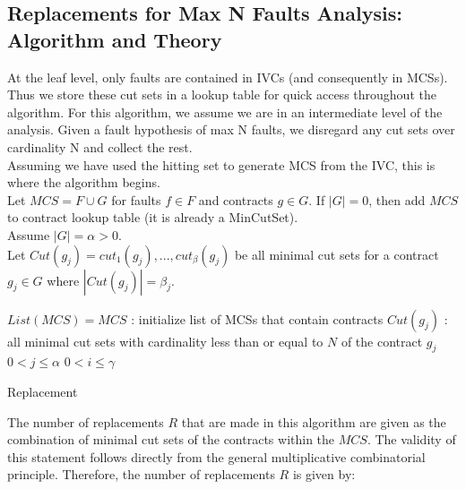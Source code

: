 \subsection{Replacements for Max N Faults Analysis: Algorithm and Theory}

At the leaf level, only faults are contained in IVCs (and consequently in MCSs). Thus we store these cut sets in a lookup table for quick access throughout the algorithm. For this algorithm, we assume we are in an intermediate level of the analysis. Given a fault hypothesis of max N faults, we disregard any cut sets over cardinality N and collect the rest.\\

Assuming we have used the hitting set to generate MCS from the IVC, this is where the algorithm begins. \\

Let $MCS = F \cup G$ for faults $f \in F$ and contracts $g \in G$. If $|G| = 0$, then add $MCS$ to contract lookup table (it is already a MinCutSet). \\

Assume $|G| = \alpha > 0$.\\

Let $Cut(g_j) = {cut_1(g_j), ..., cut_{\beta}(g_j)}$ be all minimal cut sets for a contract $g_j \in G$ where $|Cut(g_j)|=\beta_j$.\\

\begin{algorithm}[H]
	$List(MCS) = {MCS}$ : initialize list of MCSs that contain contracts \;
	$Cut(g_j)$ : all minimal cut sets with cardinality less than or equal to $N$ of the contract $g_j$ \;
	$0 < j \leq \alpha$ \;
	$0 < i \leq \gamma$ \;
	\caption{Replacement}
	\label{alg:repl_alg}
\end{algorithm}

The number of replacements $R$ that are made in this algorithm are given as the combination of minimal cut sets of the contracts within the $MCS$. The validity of this statement follows directly from the general multiplicative combinatorial principle. Therefore, the number of replacements $R$ is given by:\\


